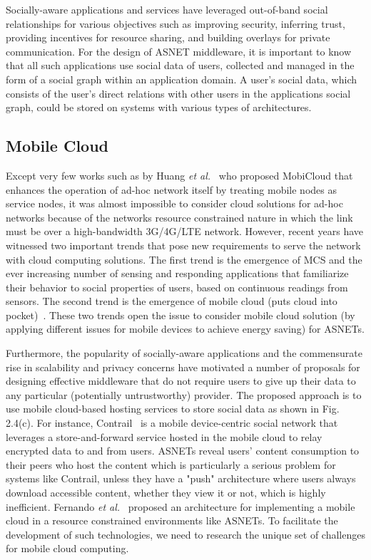 Socially-aware applications and services have leveraged out-of-band social relationships for various objectives such as improving security, inferring trust, providing incentives for resource sharing, and building overlays for private communication. For the design of ASNET middleware, it is important to know that all such applications use social data of users, collected and managed in the form of a social graph within an application domain. A user's social data, which consists of the user's direct relations with other users in the applications social graph, could be stored on systems with various types of architectures.


\subsection{Mobile Cloud}\label{Chap2_03_02}
Except very few works such as by Huang {\it et al.}~\cite{DHuang2010} who proposed MobiCloud that enhances the operation of ad-hoc network itself by treating mobile nodes as service nodes, it was almost impossible to consider cloud solutions for ad-hoc networks because of the networks resource constrained nature in which the link must be over a high-bandwidth 3G/4G/LTE network. However, recent years have witnessed two important trends that pose new requirements to serve the network with cloud computing solutions. The first trend is the emergence of MCS and the ever increasing number of sensing and responding applications that familiarize their behavior to social properties of users, based on continuous readings from sensors. The second trend is the emergence of mobile cloud (puts cloud into pocket)~\cite{NFernando2013}. These two trends open the issue to consider mobile cloud solution (by applying different issues for mobile devices to achieve energy saving) for ASNETs.

Furthermore, the popularity of socially-aware applications and the commensurate rise in scalability and privacy concerns have motivated a number of proposals for designing effective middleware that do not require users to give up their data to any particular (potentially untrustworthy) provider. The proposed approach is to use mobile cloud-based hosting services to store social data as shown in Fig. 2.4(c). For instance, Contrail~\cite{PStuedi2011} is a mobile device-centric social network that leverages a store-and-forward service hosted in the mobile cloud to relay encrypted data to and from users. ASNETs reveal users' content consumption to their peers who host the content which is particularly a serious problem for systems like Contrail, unless they have a "push" architecture where users always download accessible content, whether they view it or not, which is highly inefficient. Fernando {\it et al.}~\cite{NFernando2013} proposed an architecture for implementing a mobile cloud in a resource constrained environments like ASNETs. To facilitate the development of such technologies, we need to research the unique set of challenges for mobile cloud computing.

